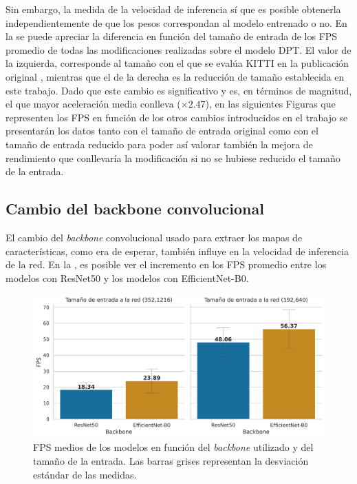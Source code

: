 Sin embargo, la medida de la velocidad de inferencia sí que es posible obtenerla independientemente de que los pesos correspondan al modelo entrenado o no. En la  se puede apreciar la diferencia en función del tamaño de entrada de los FPS promedio de todas las modificaciones realizadas sobre el modelo DPT. El valor de la izquierda, corresponde al tamaño con el que se evalúa KITTI en la publicación original \cite{visiontransformersDPT}, mientras que el de la derecha es la reducción de tamaño establecida en este trabajo. Dado que este cambio es significativo y es, en términos de magnitud, el que mayor aceleración media conlleva ($\times2.47$), en las siguientes Figuras que representen los FPS en función de los otros cambios introducidos en el trabajo se presentarán los datos tanto con el tamaño de entrada original como con el tamaño de entrada reducido para poder así valorar también la mejora de rendimiento que conllevaría la modificación si no se hubiese reducido el tamaño de la entrada.



















\subsection{Cambio del backbone convolucional}\label{resultados-cuantitativos-backbone}
El cambio del \textit{backbone} convolucional usado para extraer los mapas de características, como era de esperar, también influye en la velocidad de inferencia de la red. En la , es posible ver el incremento en los FPS promedio entre los modelos con ResNet50 y los modelos con EfficientNet-B0.

\begin{figure}[H]
\centering
\includegraphics[width=0.8\linewidth]{imagenes/Resultados/velocidad_inferencia_backbone.png} 
\captionsetup{width=.8\linewidth}
\caption{FPS medios de los modelos en función del \textit{backbone} utilizado y del tamaño de la entrada. Las barras grises representan la desviación estándar de las medidas.}
\label{fig:resultados-inf-backbone}
\end{figure}

